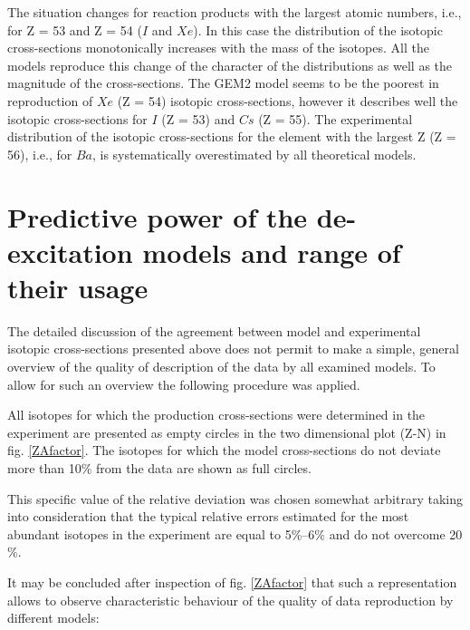 The situation changes for reaction products with the largest atomic numbers, i.e., for Z = 53 and Z = 54 ($I$ and $Xe$). In this case the distribution of the isotopic cross-sections monotonically increases with the mass of the  isotopes. All the models reproduce this change of the character of the distributions as well as the magnitude of the cross-sections. The GEM2 model seems to be the poorest in reproduction of $Xe$ (Z = 54) isotopic cross-sections, however it describes well the isotopic cross-sections for $I$ (Z = 53) and $Cs$ (Z = 55). The experimental distribution of the isotopic cross-sections for the element with the largest Z (Z = 56), i.e., for $Ba$, is systematically overestimated by all theoretical models.


\section{Predictive power of the de-excitation models and range of their usage}

The detailed discussion of the agreement between model and experimental isotopic cross-sections presented above does not permit to make a simple, general overview of the quality of description of the data by all examined models. To allow for such an overview the following procedure was applied. 

All isotopes for which the production cross-sections were determined in the experiment \cite{napolitani2007measurement} are presented as empty circles in the two dimensional plot (Z-N) in fig. \ref{ZAfactor}. The isotopes for which the model cross-sections do not deviate more than 10$\%$ from the data are shown as full circles. 

This specific value of the relative deviation was chosen somewhat arbitrary taking into  consideration that the typical relative errors estimated for the most abundant isotopes in the experiment \cite{napolitani2007measurement} are equal to 5$\%$–6$\%$ and do not overcome 20$\%$. 

It may be concluded after inspection of fig. \ref{ZAfactor} that such a representation allows to observe 
characteristic behaviour of the quality of data  reproduction by different models:

